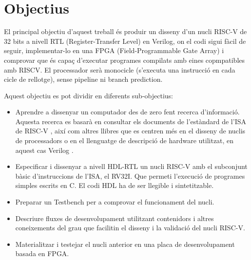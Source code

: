 \documentclass[10pt,a4paper,twocolumn,twoside]{article}
\begin{document}
\section{Objectius} 
\label{sec:Obj}
El principal objectiu d'aquest treball és produir un disseny d'un nucli RISC-V de 32 bits a nivell RTL (Register-Transfer Level) en Verilog, on el codi sigui fàcil de seguir, implementar-lo en una FPGA (Field-Programmable Gate Array) i comprovar que és capaç d’executar programes compilats amb eines copmpatibles amb RISCV. El processador serà monocicle (s'executa una instrucció en cada cicle de rellotge), sense pipeline ni branch prediction.

Aquest objectiu es pot dividir en diferents sub-objectius:

\begin{itemize}

    \item Aprendre a dissenyar un computador des de zero fent recerca d'informació. Aquesta recerca es basarà en consultar els documents de l’estàndard de l'ISA de RISC-V \cite{waterman_volume_2019} \cite{waterman_volume_2019-1}, així com altres llibres que es centren més en el disseny de nuclis de processadors \cite{patterson_computer_2018} o en el llenguatge de descripció de hardware utilitzat, en aquest cas Verilog \cite{li_implementing_2018}.

    \item Especificar i dissenyar a nivell HDL-RTL un nucli RISC-V amb el subconjunt bàsic d'instruccions de l’ISA, el RV32I. Que permeti l'execució de programes simples escrits en C. El codi HDL ha de ser llegible i sintetitzable.
    
    \item Preparar un Testbench per a comprovar el funcionament del nucli.
    
    \item Descriure fluxes de desenvolupament utilitzant contenidors i altres coneixements del grau que facilitin el disseny i la validació del nucli RISC-V.  
    
    \item Materialitzar i testejar el nucli anterior en una placa de desenvolupament basada en FPGA.
    
        
\end{itemize}
\end{document}
